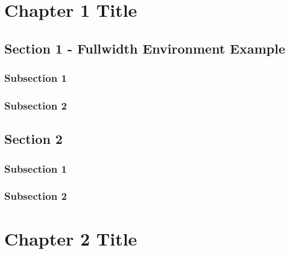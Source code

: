 \documentclass{tufte-book}
\begin{document}
\chapter{Chapter 1 Title}
\label{ch:1}


\section{Section 1 - Fullwidth Environment Example}

\begin{fullwidth}
\lipsum[5]
\end{fullwidth}

\subsection{Subsection 1}

\lipsum[6-7]

\subsection{Subsection 2}

\lipsum[7-8]


\section{Section 2}

\subsection{Subsection 1}

\lipsum[9-10]

\subsection{Subsection 2}

\lipsum[11-12]


\chapter{Chapter 2 Title}
\label{ch:2}
\end{document}
